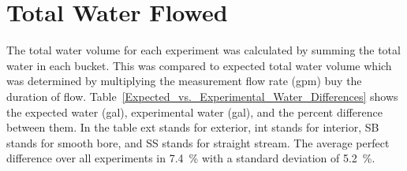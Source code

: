 \documentclass[12pt,oneside]{book}
\begin{document}


\appendix

\chapter{Total Water Flowed}
\label{app:Water_Volume}

The total water volume for each experiment was calculated by summing the total water in each bucket. This was compared to expected total water volume which was determined by multiplying the measurement flow rate (gpm) buy the duration of flow. Table~\ref{Expected_vs._Experimental_Water_Differences} shows the expected water (gal), experimental water (gal), and the percent difference between them. In the table ext stands for exterior, int stands for interior, SB stands for smooth bore, and SS stands for straight stream. The average perfect difference over all experiments in 7.4~\% with a standard deviation of 5.2~\%.
\end{document}
